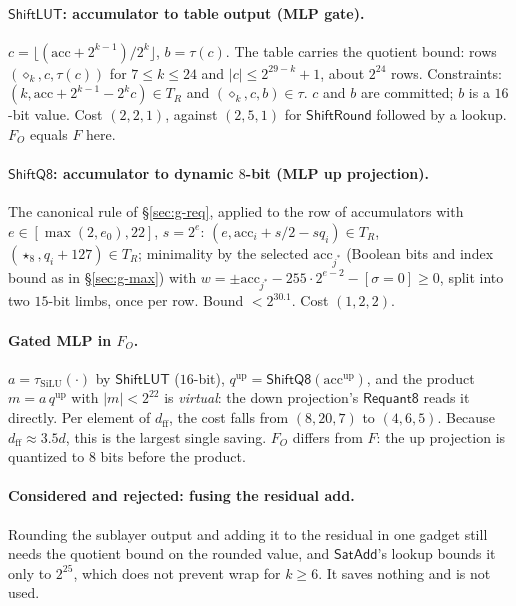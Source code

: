 \documentclass[11pt]{article}
\begin{document}
\paragraph{\(\mathsf{ShiftLUT}\): accumulator to table output (MLP gate).}
\(c = \lfloor (\mathrm{acc} + 2^{k-1})/2^k \rfloor\), \(b = \tau(c)\).
The table carries the quotient bound: rows \((\diamond_k, c, \tau(c))\) for \(7 \le k \le 24\) and \(|c| \le 2^{29-k}+1\), about \(2^{24}\) rows.
Constraints: \((k, \mathrm{acc} + 2^{k-1} - 2^k c) \in T_R\) and \((\diamond_k, c, b) \in \tau\).
\(c\) and \(b\) are committed; \(b\) is a \(16\)-bit value.
Cost \((2,2,1)\), against \((2,5,1)\) for \(\mathsf{ShiftRound}\) followed by a lookup.
\(F_O\) equals \(F\) here.

\paragraph{\(\mathsf{ShiftQ8}\): accumulator to dynamic \(8\)-bit (MLP up projection).}
The canonical rule of \S\ref{sec:g-req}, applied to the row of accumulators with \(e \in [\max(2, e_0), 22]\), \(s = 2^e\):
\((e, \mathrm{acc}_i + s/2 - s q_i) \in T_R\), \((\star_8, q_i + 127) \in T_R\); minimality by the selected \(\mathrm{acc}_{j^\ast}\) (Boolean bits and index bound as in \S\ref{sec:g-max}) with \(w = \pm \mathrm{acc}_{j^\ast} - 255 \cdot 2^{e-2} - [\sigma = 0] \ge 0\), split into two \(15\)-bit limbs, once per row.
Bound \(< 2^{30.1}\).
Cost \((1,2,2)\).

\paragraph{Gated MLP in \(F_O\).}
\(a = \tau_{\mathrm{SiLU}}(\cdot)\) by \(\mathsf{ShiftLUT}\) (\(16\)-bit), \(q^{\mathrm{up}} = \mathsf{ShiftQ8}(\mathrm{acc}^{\mathrm{up}})\), and the product \(m = a\, q^{\mathrm{up}}\) with \(|m| < 2^{22}\) is \emph{virtual}: the down projection's \(\mathsf{Requant8}\) reads it directly.
Per element of \(d_{\mathrm{ff}}\), the cost falls from \((8, 20, 7)\) to \((4, 6, 5)\).
Because \(d_{\mathrm{ff}} \approx 3.5 d\), this is the largest single saving.
\(F_O\) differs from \(F\): the up projection is quantized to \(8\) bits before the product.

\paragraph{Considered and rejected: fusing the residual add.}
Rounding the sublayer output and adding it to the residual in one gadget still needs the quotient bound on the rounded value, and \(\mathsf{SatAdd}\)'s lookup bounds it only to \(2^{25}\), which does not prevent wrap for \(k \ge 6\).
It saves nothing and is not used.
\end{document}
